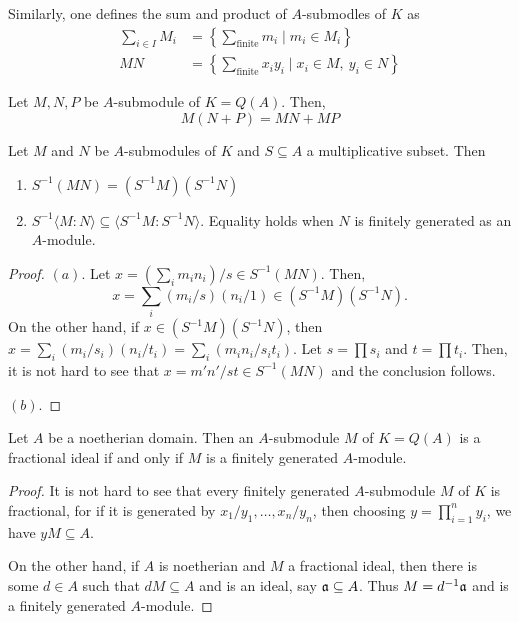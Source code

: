 Similarly, one defines the sum and product of $A$-submodles of $K$ as 
\begin{align*}
    \sum_{i\in I}M_i &= \left\{\sum_{\text{finite}}m_i\mid m_i\in M_i\right\}\\
    MN &= \left\{\sum_{\text{finite}}x_iy_i\mid x_i\in M,~y_i\in N\right\}
\end{align*}

\begin{proposition}
    Let $M, N, P$ be $A$-submodule of $K = Q(A)$. Then, 
    \begin{equation*}
        M(N + P) = MN + MP
    \end{equation*}
\end{proposition}

\begin{proposition}
    Let $M$ and $N$ be $A$-submodules of $K$ and $S\subseteq A$ a multiplicative subset. Then 
    \begin{enumerate}[label=(\alph*)]
        \item $S^{-1}(MN) = (S^{-1}M)(S^{-1}N)$
        \item $S^{-1}\langle M:N\rangle\subseteq\langle S^{-1}M : S^{-1}N\rangle$. Equality holds when $N$ is finitely generated as an $A$-module.
    \end{enumerate}
\end{proposition}
\begin{proof}
    $(a)$. Let $x = (\sum_i m_in_i)/s\in S^{-1}(MN)$. Then, 
    \begin{equation*}
        x = \sum_{i}(m_i/s)(n_i/1)\in (S^{-1}M)(S^{-1}N).
    \end{equation*}
    On the other hand, if $x\in (S^{-1}M)(S^{-1}N)$, then $x = \sum_i(m_i/s_i)(n_i/t_i) = \sum_i (m_in_i/s_it_i)$. Let $s = \prod s_i$ and $t = \prod t_i$. Then, it is not hard to see that $x = m'n'/st\in S^{-1}(MN)$ and the conclusion follows. 

    $(b)$.
\end{proof}

\begin{proposition}
    Let $A$ be a noetherian domain. Then an $A$-submodule $M$ of $K = Q(A)$ is a fractional ideal if and only if $M$ is a finitely generated $A$-module.
\end{proposition}
\begin{proof}
    It is not hard to see that every finitely generated $A$-submodule $M$ of $K$ is fractional, for if it is generated by $x_1/y_1,\ldots,x_n/y_n$, then choosing $y = \prod_{i = 1}^n y_i$, we have $yM\subseteq A$.

    On the other hand, if $A$ is noetherian and $M$ a fractional ideal, then there is some $d\in A$ such that $dM\subseteq A$ and is an ideal, say $\mathfrak a\subseteq A$. Thus $M = d^{-1}\mathfrak a$ and is a finitely generated $A$-module.
\end{proof}

